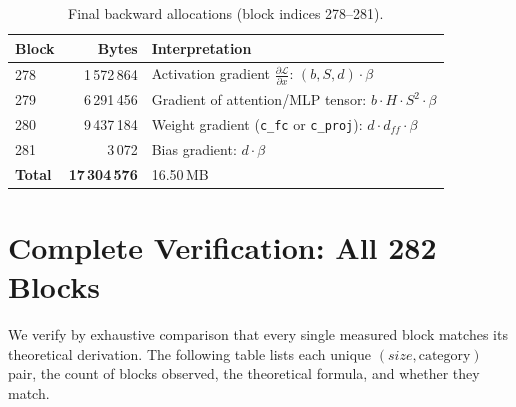 \documentclass[11pt,a4paper]{article}
\begin{document}
\begin{table}[h]
\centering
\caption{Final backward allocations (block indices 278--281).}
\label{tab:final}
\begin{tabular}{lrl}
\toprule
\textbf{Block} & \textbf{Bytes} & \textbf{Interpretation} \\
\midrule
278 & 1\,572\,864 & Activation gradient $\frac{\partial \mathcal{L}}{\partial x}$: $(b,S,d) \cdot \beta$ \\
279 & 6\,291\,456 & Gradient of attention/MLP tensor: $b \cdot H \cdot S^2 \cdot \beta$ \\
280 & 9\,437\,184 & Weight gradient (\texttt{c\_fc} or \texttt{c\_proj}): $d \cdot d_{ff} \cdot \beta$ \\
281 & 3\,072      & Bias gradient: $d \cdot \beta$ \\
\midrule
\textbf{Total} & \textbf{17\,304\,576}  & 16.50\,MB \\
\bottomrule
\end{tabular}
\end{table}

\section{Complete Verification: All 282 Blocks}
\label{sec:verification}

We verify by exhaustive comparison that every single measured block matches its theoretical derivation.  The following table lists each unique $(size, \text{category})$ pair, the count of blocks observed, the theoretical formula, and whether they match.
\end{document}
